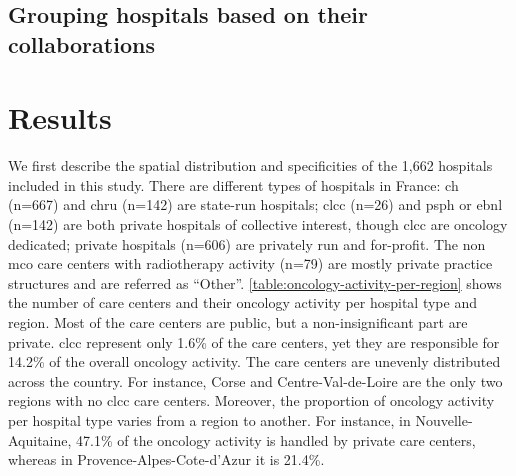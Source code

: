 \subsection{Grouping hospitals based on their collaborations}


\section{Results}

We first describe the spatial distribution and specificities of the 1,662
hospitals included in this study. There are different types of hospitals in
France: \ac{ch}  (n=667) and \ac{chru}  (n=142) are state-run hospitals;
\ac{clcc} (n=26) and \ac{psph} or \ac{ebnl} (n=142) are both private hospitals of
collective interest, though \ac{clcc} are oncology dedicated; private hospitals
(n=606) are privately run and for-profit. The non \ac{mco} care centers with
radiotherapy activity (n=79) are mostly private practice structures and are
referred as “Other”. \cref{table:oncology-activity-per-region} shows the number
of care centers and their oncology activity per hospital type and region. Most
of the care centers are public, but a non-insignificant part are private.
\ac{clcc} represent only 1.6\% of the care centers, yet they are responsible for
14.2\% of the overall oncology activity. The care centers are unevenly
distributed across the country. For instance, Corse and Centre-Val-de-Loire are
the only two regions with no \ac{clcc} care centers. Moreover, the proportion of
oncology activity per hospital type varies from a region to another. For
instance, in Nouvelle-Aquitaine, 47.1\% of the oncology activity is handled by
private care centers, whereas in Provence-Alpes-Cote-d'Azur it is 21.4\%.

